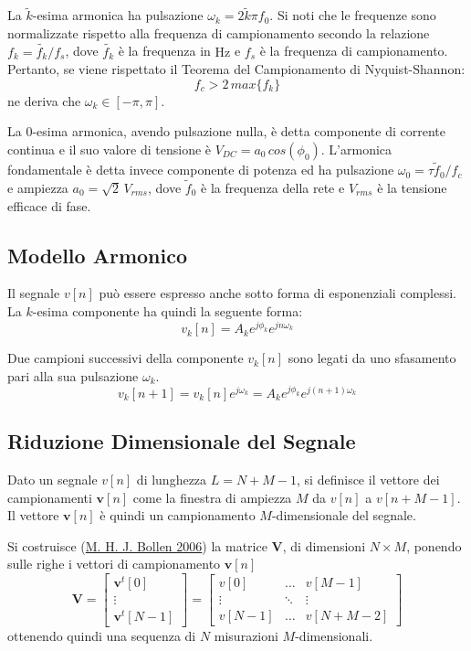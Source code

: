 \documentclass[
  italian,
]{article}
\begin{document}
La \(\tilde{k}\)-esima armonica ha pulsazione
\(\omega_k = 2 \tilde{k} \pi f_0\). Si noti che le frequenze sono
normalizzate rispetto alla frequenza di campionamento secondo la
relazione \(f_k = \tilde{f_k} / f_s\), dove \(\tilde{f_k}\) è la
frequenza in \(\si{\hertz}\) e \(f_s\) è la frequenza di campionamento.
Pertanto, se viene rispettato il Teorema del Campionamento di
Nyquist-Shannon: \[
f_c > 2 \, max\{f_k\}
\] ne deriva che \(\omega_k \in \left[ -\pi, \pi \right]\).

La \(0\)-esima armonica, avendo pulsazione nulla, è detta componente di
corrente continua e il suo valore di tensione è
\(V_{DC} = a_0 \, cos(\phi_0)\). L'armonica fondamentale è detta invece
componente di potenza ed ha pulsazione
\(\omega_0 = \tau \tilde{f}_0 / f_c\) e ampiezza
\(a_0 = \sqrt{2} \, V_{rms}\), dove \(\tilde{f}_0\) è la frequenza della
rete e \(V_{rms}\) è la tensione efficace di fase.

\hypertarget{modello-armonico}{%
\subsection{Modello Armonico}\label{modello-armonico}}

Il segnale \(v[n]\) può essere espresso anche sotto forma di
esponenziali complessi. La \(k\)-esima componente ha quindi la seguente
forma: \[
v_k[n] = A_k e^{j \phi_k} e^{j n \omega_k}
\]

Due campioni successivi della componente \(v_k[n]\) sono legati da uno
sfasamento pari alla sua pulsazione \(\omega_k\). \[
v_k[n+1] = v_k[n] e^{j \omega_k}
         = A_k e^{j \phi_k} e^{j (n+1) \omega_k}
\]

\hypertarget{riduzione-dimensionale-del-segnale}{%
\subsection{Riduzione Dimensionale del
Segnale}\label{riduzione-dimensionale-del-segnale}}

Dato un segnale \(v[n]\) di lunghezza \(L = N + M - 1\), si definisce il
vettore dei campionamenti \(\mathbf{v}[n]\) come la finestra di ampiezza
\(M\) da \(v[n]\) a \(v[n + M - 1]\). Il vettore \(\mathbf{v}[n]\) è
quindi un campionamento \(M\)-dimensionale del segnale.

Si costruisce (\protect\hyperlink{ref-dsp-pqd}{M. H. J. Bollen 2006}) la
matrice \(\mathbf{V}\), di dimensioni \(N \times M\), ponendo sulle
righe i vettori di campionamento \(\mathbf{v}[n]\) \[
\mathbf{V} =
\begin{bmatrix}
    \mathbf{v}^t[0] \\
    \vdots \\
    \mathbf{v}^t[N - 1]
\end{bmatrix}
=
\begin{bmatrix}
v[0]   & \dots  & v[M - 1] \\
\vdots & \ddots & \vdots   \\
v[N - 1] & \dots & v[N + M - 2]
\end{bmatrix}
\] ottenendo quindi una sequenza di \(N\) misurazioni
\(M\)-dimensionali.
\end{document}
